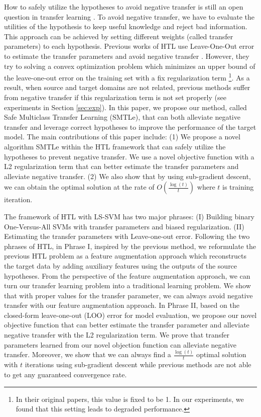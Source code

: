 How to safely utilize the hypotheses to avoid negative transfer is still an open question in transfer learning \cite{Lu201514}. To avoid negative transfer, we have to evaluate the utilities of the hypothesis to keep useful knowledge and reject bad information. This approach can be achieved by setting different weights (called transfer parameters) to each hypothesis.
Previous works of HTL use Leave-One-Out error to estimate the transfer parameters and avoid negative transfer \cite{tommasi2014learning} \cite{kuzborskij2013n}. However, they try to solving a convex
optimization problem which minimizes an upper bound of
the leave-one-out error on the training set with a fix regularization term \footnote{In their original papers, this value is fixed to be 1. In our experiments, we found that this setting leads to degraded performance.}. As a result, when source and target domains are not related, previous methods suffer from negative transfer if this regularization term is not set properly (see experiments in Section \ref{sec:exp}).
In this paper, we propose our method, {called Safe Multiclass Transfer Learning (SMTLe)}, that can both alleviate negative transfer and leverage correct hypotheses to improve the performance of the target model. 
The main contributions of this paper include: (1) We propose a novel algorithm SMTLe within the HTL framework that can safely utilize the hypotheses to prevent negative transfer. We use a novel objective function with a L2 regularization term that can better estimate the transfer parameters and alleviate negative transfer. (2) We also show that by using sub-gradient descent, we can obtain the optimal solution at the rate of $O(\frac{\log(t)}{t})$ where $t$ is training iteration.
 
The framework of HTL with LS-SVM has two major phrases: (I) Building binary One-Versus-All SVMs with transfer parameters and biased regularization. (II) Estimating the transfer parameters with Leave-one-out error.
Following the two phrases of HTL, in Phrase I, inspired by the previous method, we reformulate the previous HTL problem as a feature augmentation approach which reconstructs the target data by adding auxiliary features using the outputs of the source hypotheses. From the perspective of the feature augmentation approach, we can turn our transfer learning problem into a traditional learning problem. We show that with proper values for the transfer parameter, we can always avoid negative transfer with our feature augmentation approach. 
In Phrase II, 
based on the closed-form leave-one-out (LOO) error for model evaluation, we propose our novel objective function that can better estimate the transfer parameter and alleviate negative transfer with the L2 regularization term. We prove that transfer parameters learned from our novel objection function can alleviate negative transfer. Moreover, we show that we can always find a $\frac{\log(t)}{t}$ optimal solution with $t$ iterations using sub-gradient descent while previous methods are not able to get any guaranteed convergence rate.


